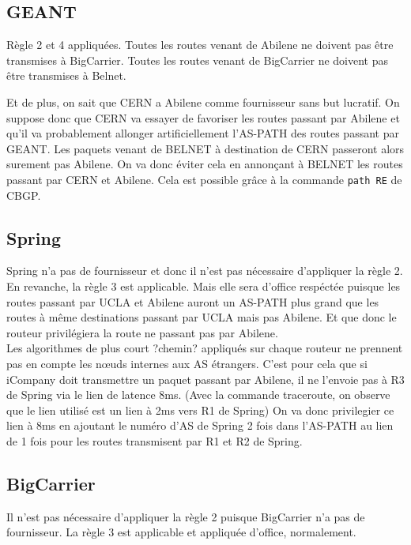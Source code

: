 \documentclass[a4paper, 12pt]{article}
\begin{document}
\subsection{GEANT}
Règle 2 et 4 appliquées. Toutes les routes venant de Abilene ne doivent pas être transmises à BigCarrier. Toutes les routes venant de BigCarrier ne doivent pas être transmises à Belnet.

Et de plus, on sait que CERN a Abilene comme fournisseur sans but lucratif. %
On suppose donc que CERN va essayer de favoriser les routes passant par Abilene et qu'il va probablement allonger artificiellement l'AS-PATH des routes passant par GEANT.
Les paquets venant de BELNET à destination de CERN passeront alors surement pas Abilene.
On va donc éviter cela en annonçant à BELNET les routes passant par CERN et Abilene.
Cela est possible grâce à la commande \texttt{path RE} de CBGP.

\subsection{Spring} %
Spring n'a pas de fournisseur et donc il n'est pas nécessaire d'appliquer la règle 2.
\\

En revanche, la règle 3 est applicable.
Mais elle sera d'office respéctée puisque les routes passant par UCLA et Abilene auront un AS-PATH plus grand que les routes à même destinations passant par UCLA mais pas Abilene.
Et que donc le routeur privilégiera la route ne passant pas par Abilene.
\\

Les algorithmes de plus court ?chemin? appliqués sur chaque routeur ne prennent pas en compte les nœuds internes aux AS étrangers.
C'est pour cela que si iCompany doit transmettre un paquet passant par Abilene, il ne l'envoie pas à R3 de Spring via le lien de latence 8ms.
(Avec la commande traceroute, on observe que le lien utilisé est un lien à 2ms vers R1 de Spring)
On va donc privilegier ce lien à 8ms en ajoutant le numéro d'AS de Spring 2 fois dans l'AS-PATH au lien de 1 fois pour les routes transmisent par R1 et R2 de Spring.

\subsection{BigCarrier}%
Il n'est pas nécessaire d'appliquer la règle 2 puisque BigCarrier n'a pas de fournisseur.
La règle 3 est applicable et appliquée d'office, normalement.
\end{document}
